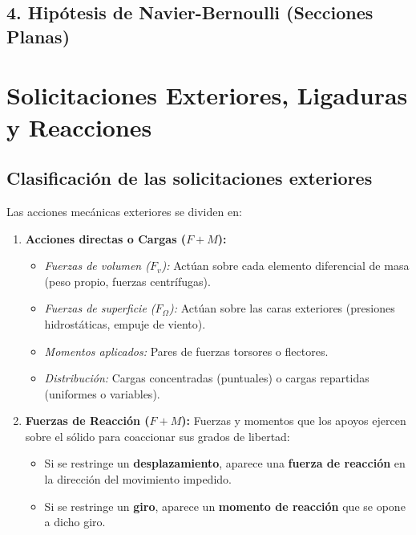\subsection{4. Hipótesis de Navier-Bernoulli (Secciones Planas)}

\section{Solicitaciones Exteriores, Ligaduras y Reacciones}

\subsection{Clasificación de las solicitaciones exteriores}
Las acciones mecánicas exteriores se dividen en:
\begin{enumerate}
    \item \textbf{Acciones directas o Cargas ($F + M$):}
          \begin{itemize}
              \item \textit{Fuerzas de volumen ($F_v$):} Actúan sobre cada elemento diferencial de masa (peso propio, fuerzas centrífugas).
              \item \textit{Fuerzas de superficie ($F_\Omega$):} Actúan sobre las caras exteriores (presiones hidrostáticas, empuje de viento).
              \item \textit{Momentos aplicados:} Pares de fuerzas torsores o flectores.
              \item \textit{Distribución:} Cargas concentradas (puntuales) o cargas repartidas (uniformes o variables).
          \end{itemize}
    \item \textbf{Fuerzas de Reacción ($F + M$):} Fuerzas y momentos que los apoyos ejercen sobre el sólido para coaccionar sus grados de libertad:
          \begin{itemize}
              \item Si se restringe un \textbf{desplazamiento}, aparece una \textbf{fuerza de reacción} en la dirección del movimiento impedido.
              \item Si se restringe un \textbf{giro}, aparece un \textbf{momento de reacción} que se opone a dicho giro.
          \end{itemize}
\end{enumerate}

